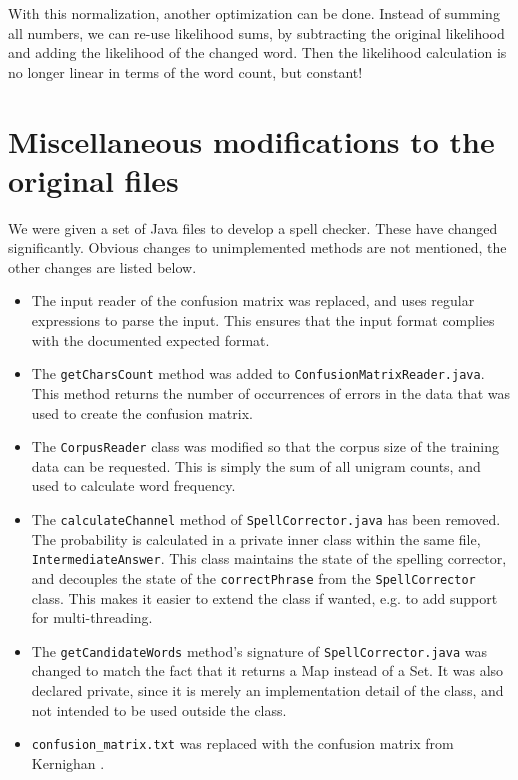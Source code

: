 \documentclass[11pt,a4paper]{article}
\begin{document}
With this normalization, another optimization can be done. Instead of summing all numbers, we can re-use likelihood sums, by subtracting the original likelihood and adding the likelihood of the changed word. Then the likelihood calculation is no longer linear in terms of the word count, but constant!

\section{Miscellaneous modifications to the original files}
We were given a set of Java files to develop a spell checker. These have changed significantly. Obvious changes to unimplemented methods are not mentioned, the other changes are listed below.

\begin{itemize}
\item The input reader of the confusion matrix was replaced, and uses regular expressions to parse the input. This ensures that the input format complies with the documented expected format.
\item The \texttt{getCharsCount} method was added to \texttt{ConfusionMatrixReader.java}. This method returns the number of occurrences of errors in the data that was used to create the confusion matrix.
\item The \texttt{CorpusReader} class was modified so that the corpus size of the training data can be requested. This is simply the sum of all unigram counts, and used to calculate word frequency.
\item The \texttt{calculateChannel} method of \texttt{SpellCorrector.java}  has been removed. The probability is calculated in a private inner class within the same file, \texttt{IntermediateAnswer}. This class maintains the state of the spelling corrector, and decouples the state of the \texttt{correctPhrase} from the \texttt{SpellCorrector} class. This makes it easier to extend the class if wanted, e.g. to add support for multi-threading.
\item The \texttt{getCandidateWords} method's signature of \texttt{SpellCorrector.java} was changed to match the fact that it returns a Map instead of a Set. It was also declared private, since it is merely an implementation detail of the class, and not intended to be used outside the class.
\item \texttt{confusion\_matrix.txt} was replaced with the confusion matrix from Kernighan \cite{kernighan}.
\end{itemize}
\end{document}

